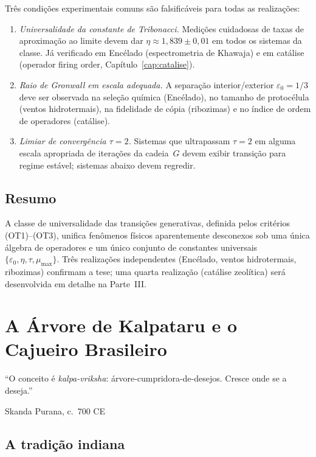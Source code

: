\documentclass[12pt,a4paper,twoside]{book}
\theoremstyle{plain}
\theoremstyle{definition}
\theoremstyle{definition}
\newcommand{\epsz}{\varepsilon_{0}}
\newcommand{\tribo}{\eta}
\begin{document}
Três condições experimentais comuns são falsificáveis para todas as
realizações:

\begin{enumerate}
  \item \emph{Universalidade da constante de Tribonacci.} Medições
        cuidadosas de taxas de aproximação ao limite devem dar
        $\tribo \approx 1{,}839 \pm 0{,}01$ em todos os sistemas da
        classe. Já verificado em Encélado (espectrometria de Khawaja)
        e em catálise (operador firing order, Capítulo~\ref{cap:catalise}).
  \item \emph{Raio de Gronwall em escala adequada.} A separação
        interior/exterior $\epsz = 1/3$ deve ser observada na
        seleção química (Encélado), no tamanho de protocélula
        (ventos hidrotermais), na fidelidade de cópia (ribozimas) e
        no índice de ordem de operadores (catálise).
  \item \emph{Limiar de convergência $\tau = 2$.} Sistemas que ultrapassam
        $\tau = 2$ em alguma escala apropriada de iterações da cadeia~$G$
        devem exibir transição para regime estável; sistemas abaixo
        devem regredir.
\end{enumerate}

\section{Resumo}

A classe de universalidade das transições generativas, definida pelos
critérios (OT1)--(OT3), unifica fenômenos físicos aparentemente desconexos
sob uma única álgebra de operadores e um único conjunto de constantes
universais $\{\epsz, \tribo, \tau, \mu_{\max}\}$. Três realizações
independentes (Encélado, ventos hidrotermais, ribozimas) confirmam a
tese; uma quarta realização (catálise zeolítica) será desenvolvida em
detalhe na Parte~III.

\chapter{A Árvore de Kalpataru e o Cajueiro Brasileiro}
\label{cap:kalpataru}

\epigraph{``O conceito é \emph{kalpa-vriksha}: árvore-cumpridora-de-desejos.
Cresce onde se a deseja.''}{Skanda Purana, c.~700 CE}

\section{A tradição indiana}
\end{document}
